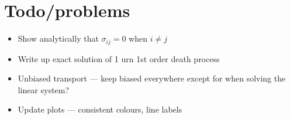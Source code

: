 \documentclass[a4paper,11pt]{article}
\numberwithin{equation}{section}
\begin{document}
\FloatBarrier
\section{Todo/problems}
\begin{itemize}
    \item Show analytically that \(\sigma_{ij} = 0\) when \(i \neq j\)
    \item Write up exact solution of 1 urn 1st order death process
    \item Unbiased transport --- keep biased everywhere except for when solving
        the linear system?
    \item Update plots --- consistent colours, line labels
\end{itemize}


\end{document}
